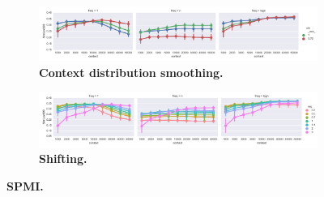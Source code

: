 \begin{figure}
  \centering
  \begin{subfigure}[b]{\textwidth}
    \includegraphics[width=\textwidth]{supplement/figures/simlex-ppmi-cds.pdf}
    \caption{\textbf{Context distribution smoothing.}}
    \label{fig:simlex-ppmi-interaction-cds}
  \end{subfigure}

  \begin{subfigure}[b]{\textwidth}
    \includegraphics[width=\textwidth]{supplement/figures/simlex-ppmi-neg.pdf}
    \caption{\textbf{Shifting.}}
    \label{fig:simlex-ppmi-interaction-neg}
  \end{subfigure}

  \caption{\textbf{SPMI.}}
  \label{fig:simlex-ppmi-interaction}
\end{figure}


